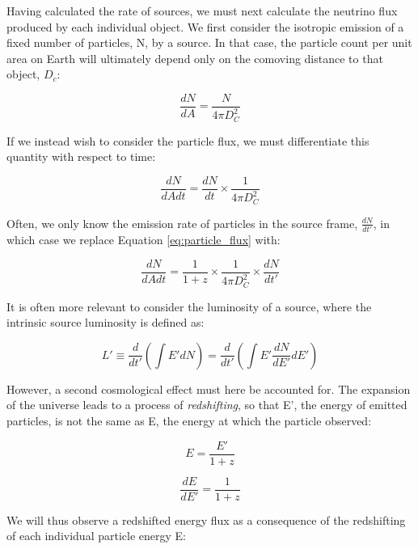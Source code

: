 Having  calculated the rate of sources, we must next calculate the neutrino flux produced by each individual object. We first consider the isotropic emission of a fixed number of particles, N, by a source. In that case, the particle count per unit area on Earth will ultimately depend only on the comoving distance to that object, $D_{c}$:

\begin{equation}
\frac{dN}{dA} = \frac{N}{4 \pi D_{C}^{2}}
\label{eq:particle_per_area}
\end{equation}

If we instead wish to consider the particle flux, we must differentiate this quantity with respect to time:

\begin{equation}
\frac{dN}{dAdt} = \frac{dN}{dt} \times \frac{1}{4 \pi D_{C}^{2}}
\label{eq:particle_flux}
\end{equation}

Often, we only know the emission rate of particles in the source frame, $\frac{dN}{dt'}$, in which case we replace Equation \ref{eq:particle_flux} with:

\begin{equation}
\frac{dN}{dAdt} = \frac{1}{1+z} \times \frac{1}{4 \pi D_{C}^{2}} \times \frac{dN}{dt'}
\label{eq:alt_particle_flux}
\end{equation}

It is often more relevant to consider the luminosity of a source, where the intrinsic source luminosity is defined as:

\begin{equation}
L' \equiv \frac{d}{dt'} \left( \int E' dN \right) = \frac{d}{dt'} \left( \int E' \frac{dN}{dE'} dE' \right)
\end{equation}

However, a second cosmological effect must here be accounted for. The expansion of the universe leads to a process of \emph{redshifting}, so that E', the energy of emitted particles, is not the same as E, the energy at which the particle observed:

\begin{equation}
E = \frac{E'}{1+z}
\label{eq:redshift}
\end{equation}

\begin{equation}
\frac{dE}{dE'} = \frac{1}{1+z}
\label{eq:de}
\end{equation}

We will thus observe a redshifted energy flux as a consequence of the redshifting of each individual particle energy E:

